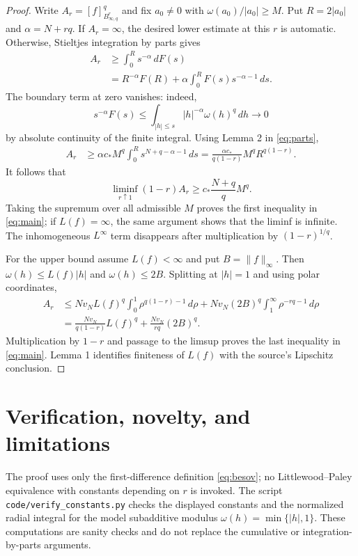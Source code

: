 \documentclass[11pt]{article}
\begin{document}
\begin{proof}
Write $A_r=[f]_{B^r_{\infty,q}}^q$ and fix $a_0\ne0$ with
$\omega(a_0)/|a_0|\geq M$. Put $R=2|a_0|$ and
$\alpha=N+rq$. If $A_r=\infty$, the desired lower estimate at this $r$ is
automatic. Otherwise, Stieltjes integration by parts gives
\begin{align}
 A_r
 &\geq\int_{0}^{R}s^{-\alpha}\,dF(s)\\
 &=R^{-\alpha}F(R)+\alpha\int_0^R F(s)s^{-\alpha-1}\,ds.
 \label{eq:parts}
\end{align}
The boundary term at zero vanishes: indeed,
\[
 s^{-\alpha}F(s)
 \leq\int_{|h|\leq s}|h|^{-\alpha}\omega(h)^q\,dh\longrightarrow0
\]
by absolute continuity of the finite integral. Using
Lemma 2 in \eqref{eq:parts},
\begin{align}
 A_r
 &\geq \alpha c_*M^q
   \int_0^R s^{N+q-\alpha-1}\,ds
 =\frac{\alpha c_*}{q(1-r)}M^qR^{q(1-r)}.
 \label{eq:lower}
\end{align}
It follows that
\[
 \liminf_{r\uparrow1}(1-r)A_r
 \geq c_*\frac{N+q}{q}M^q.
\]
Taking the supremum over all admissible $M$ proves the first inequality in
\eqref{eq:main}; if $L(f)=\infty$, the same argument shows that the liminf is
infinite. The inhomogeneous $L^\infty$ term disappears after multiplication
by $(1-r)^{1/q}$.

For the upper bound assume $L(f)<\infty$ and put $B=\|f\|_\infty$. Then
$\omega(h)\leq L(f)|h|$ and $\omega(h)\leq2B$. Splitting at $|h|=1$ and
using polar coordinates,
\begin{align*}
 A_r
 &\leq Nv_NL(f)^q\int_0^1\rho^{q(1-r)-1}\,d\rho
   +Nv_N(2B)^q\int_1^\infty\rho^{-rq-1}\,d\rho\\
 &=\frac{Nv_N}{q(1-r)}L(f)^q+\frac{Nv_N}{rq}(2B)^q.
\end{align*}
Multiplication by $1-r$ and passage to the limsup proves the last inequality
in \eqref{eq:main}. Lemma 1 identifies finiteness of $L(f)$ with the source's
Lipschitz conclusion.
\end{proof}

\section{Verification, novelty, and limitations}

The proof uses only the first-difference definition \eqref{eq:besov}; no
Littlewood--Paley equivalence with constants depending on $r$ is invoked. The
script \texttt{code/verify\_constants.py} checks the displayed constants and
the normalized radial integral for the model subadditive modulus
$\omega(h)=\min\{|h|,1\}$. These computations are sanity checks and do not
replace the cumulative or integration-by-parts arguments.
\end{document}
